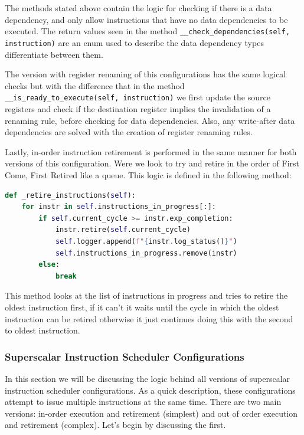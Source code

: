 \documentclass{article}
\begin{document}
The methods stated above contain the logic for checking if there is a data dependency, and only allow instructions that have no data dependencies to be executed. The return values seen in the method \lstinline|__check_dependencies(self, instruction)| are an enum used to describe the data dependency types differentiate between them.

The version with register renaming of this configurations has the same logical checks but with the difference that in the method \lstinline| __is_ready_to_execute(self, instruction)| we first update the source registers and check if the destination register implies the invalidation of a renaming rule, before checking for data dependencies. Also, any write-after data dependencies are solved with the creation of register renaming rules.

Lastly, in-order instruction retirement is performed in the same manner for both versions of this configuration. Were we look to try and retire in the order of First Come, First Retired like a queue. This logic is defined in the following method:

\begin{lstlisting}[language=Python]
def _retire_instructions(self): 
    for instr in self.instructions_in_progress[:]:
        if self.current_cycle >= instr.exp_completion:
            instr.retire(self.current_cycle)
            self.logger.append(f"{instr.log_status()}")
            self.instructions_in_progress.remove(instr)
        else:
            break
\end{lstlisting}

This method looks at the list of instructions in progress and tries to retire the oldest instruction first, if it can't it waits until the cycle in which the oldest instruction can be retired otherwise it just continues doing this with the second to oldest instruction.

\subsubsection{Superscalar Instruction Scheduler Configurations}
In this section we will be discussing the logic behind all versions of superscalar instruction scheduler configurations. As a quick description, these configurations attempt to issue multiple instructions at the same time. There are two main versions: in-order execution and retirement (simplest) and out of order execution and retirement (complex). Let's begin by discussing the first.
\end{document}
